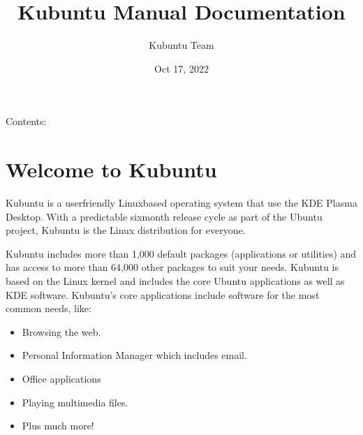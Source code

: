 \documentclass[letterpaper,10pt,english]{sphinxmanual}
\title{Kubuntu Manual Documentation}
\date{Oct 17, 2022}
\author{Kubuntu Team}
\begin{document}
\pagestyle{empty}
\sphinxmaketitle
\pagestyle{plain}
\sphinxtableofcontents
\pagestyle{normal}
\label{\detokenize{index::doc}}


\sphinxAtStartPar
Contents:


\chapter{Welcome to Kubuntu}
\label{\detokenize{welcome:welcome-to-kubuntu}}\label{\detokenize{welcome::doc}}

\sphinxAtStartPar
Kubuntu is a user\sphinxhyphen{}friendly Linux\sphinxhyphen{}based operating system that use the KDE Plasma Desktop. With a predictable
six\sphinxhyphen{}month release cycle as part of the Ubuntu project, Kubuntu is the Linux distribution for everyone.

\sphinxAtStartPar
Kubuntu includes more than 1,000 default packages (applications or utilities) and has access to more than 64,000 other packages to suit your needs. Kubuntu is based on the Linux kernel and includes the core Ubuntu applications as well as KDE software. Kubuntu’s core applications include software for the most common needs, like:
\begin{itemize}
\item {} 
\sphinxAtStartPar
Browsing the web.

\item {} 
\sphinxAtStartPar
Personal Information Manager which includes email.

\item {} 
\sphinxAtStartPar
Office applications

\item {} 
\sphinxAtStartPar
Playing multimedia files.

\item {} 
\sphinxAtStartPar
Plus much more!

\end{itemize}
\end{document}
